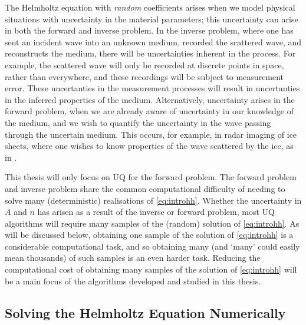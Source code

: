The Helmholtz equation with \emph{random} coefficients arises when we model physical situations with uncertainty in the material parameters; this uncertainty can arise in both the forward and inverse problem. In the inverse problem, where one has sent an incident wave into an unknown medium, recorded the scattered wave, and reconstructs the medium, there will be uncertainties inherent in the process. For example, the scattered wave will only be recorded at discrete points in space, rather than everywhere, and these recordings will be subject to measurement error. These uncertanties in the measurement processes will result in uncertanties in the inferred properties of the medium. Alternatively, uncertainty arises in the forward problem, when we are already aware of uncertainty in our knowledge of the medium, and we wish to quantify the uncertainty in the wave passing through the uncertain medium. This occurs, for example, in radar imaging of ice sheets, where one wishes to know properties of the wave scattered by the ice, as in \cite{JiPi:18}.

This thesis will only focus on UQ for the forward problem. The forward problem and inverse problem share the common computational difficulty of needing to solve many (deterministic) realisations of \eqref{eq:introhh}. Whether the uncertainty in $A$ and $n$ has arisen as a result of the inverse or forward problem, most UQ algorithms will require many samples of the (random) solution of \eqref{eq:introhh}. As will be discussed below, obtaining one sample of the solution of \eqref{eq:introhh} is a considerable computational task, and so obtaining many (and `many' could easily mean thousands) of such samples is an even harder task. Reducing the computational cost of obtaining many samples of the solution of \eqref{eq:introhh} will be a main focus of the algorithms developed and studied in this thesis.%

\subsection{Solving the Helmholtz Equation Numerically}\label{sec:numsolve}

